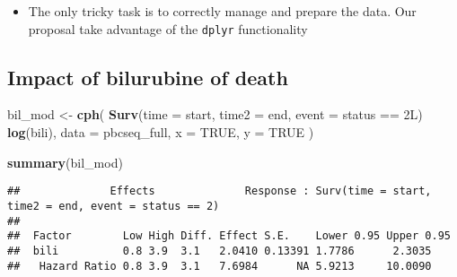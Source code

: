 \documentclass[]{book}
\newenvironment{Shaded}{\begin{snugshade}}{\end{snugshade}}
\newcommand{\KeywordTok}[1]{\textcolor[rgb]{0.13,0.29,0.53}{\textbf{{#1}}}}
\newcommand{\DataTypeTok}[1]{\textcolor[rgb]{0.13,0.29,0.53}{{#1}}}
\newcommand{\StringTok}[1]{\textcolor[rgb]{0.31,0.60,0.02}{{#1}}}
\newcommand{\CommentTok}[1]{\textcolor[rgb]{0.56,0.35,0.01}{\textit{{#1}}}}
\newcommand{\OtherTok}[1]{\textcolor[rgb]{0.56,0.35,0.01}{{#1}}}
\newcommand{\NormalTok}[1]{{#1}}
\providecommand{\tightlist}{%
  \setlength{\itemsep}{0pt}\setlength{\parskip}{0pt}}
\theoremstyle{definition}
\theoremstyle{definition}
\theoremstyle{definition}
\theoremstyle{remark}
\begin{document}
\begin{itemize}
\tightlist
\item
  The only tricky task is to correctly manage and prepare the data. Our
  proposal take advantage of the \texttt{dplyr} functionality
\end{itemize}

\begin{Shaded}
\end{Shaded}

\subsection{Impact of bilurubine of death}\label{bilurubine2}

\begin{Shaded}
\begin{Highlighting}[]
\NormalTok{bil_mod <-}\StringTok{ }\KeywordTok{cph}\NormalTok{(}
  \KeywordTok{Surv}\NormalTok{(}\DataTypeTok{time =} \NormalTok{start, }\DataTypeTok{time2 =} \NormalTok{end, }\DataTypeTok{event =} \NormalTok{status ==}\StringTok{ }\NormalTok{2L) ~}\StringTok{ }\KeywordTok{log}\NormalTok{(bili),}
  \DataTypeTok{data =} \NormalTok{pbcseq_full,}
  \DataTypeTok{x    =} \OtherTok{TRUE}\NormalTok{,}
  \DataTypeTok{y    =} \OtherTok{TRUE}
\NormalTok{)}

\KeywordTok{summary}\NormalTok{(bil_mod)}
\end{Highlighting}
\end{Shaded}

\begin{verbatim}
##              Effects              Response : Surv(time = start, time2 = end, event = status == 2) 
## 
##  Factor        Low High Diff. Effect S.E.    Lower 0.95 Upper 0.95
##  bili          0.8 3.9  3.1   2.0410 0.13391 1.7786      2.3035   
##   Hazard Ratio 0.8 3.9  3.1   7.6984      NA 5.9213     10.0090
\end{verbatim}
\end{document}
